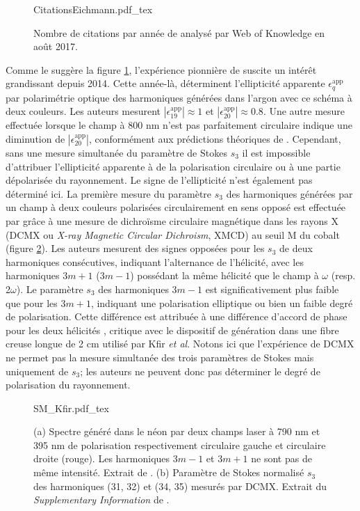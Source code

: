 \begin{figure}[ht]
\centering
\def\svgwidth{0.5\textwidth}
{CitationsEichmann.pdf_tex}
\caption{Nombre de citations par année de  analysé par Web of Knowledge en août 2017.}
\label{fig:CitationsEichmann}
\end{figure}

Comme le suggère la figure \ref{fig:CitationsEichmann}, l'expérience pionnière de  suscite un intérêt grandissant depuis 2014. Cette année-là,  déterminent l'ellipticité apparente $\epsilon_{q}^{\text{app}}$ par polarimétrie optique des harmoniques générées dans l'argon avec ce schéma à deux couleurs. Les auteurs mesurent $|\epsilon_{19}^{\text{app}}| \approx 1 $ et $|\epsilon_{20}^{\text{app}}| \approx 0.8$. Une autre mesure effectuée lorsque le champ à 800 nm n'est pas parfaitement circulaire indique une diminution de $|\epsilon_{20}^{\text{app}}|$, conformément aux prédictions théoriques de . Cependant, sans une mesure simultanée du paramètre de Stokes $s_3$ il est impossible d'attribuer l'ellipticité apparente à de la polarisation circulaire ou à une partie dépolarisée du rayonnement. Le signe de l'ellipticité n'est également pas déterminé ici. La première mesure du paramètre $s_3$ des harmoniques générées par un champ à deux couleurs polarisées circulairement en sens opposé est effectuée par  grâce à une mesure de dichroïsme circulaire magnétique dans les rayons X (DCMX ou \textit{X-ray Magnetic Circular Dichroism}, XMCD) au seuil M du cobalt (figure \ref{fig:SM_Kfir}). Les auteurs mesurent des signes opposées pour les $s_3$ de deux harmoniques consécutives, indiquant l'alternance de l'hélicité, avec les harmoniques $3m+1$ ($3m-1$) possédant la même hélicité que le champ à $\omega$ (resp. 2$\omega$). Le paramètre $s_3$ des harmoniques $3m-1$ est significativement plus faible que pour les $3m+1$, indiquant une polarisation elliptique ou bien un faible degré de polarisation. Cette différence est attribuée à une différence d'accord de phase pour les deux hélicités , critique avec le dispositif de génération dans une fibre creuse longue de 2 cm utilisé par Kfir \textit{et al}. Notons ici que l'expérience de DCMX ne permet pas la mesure simultanée des trois paramètres de Stokes mais uniquement de $s_3$; les auteurs ne peuvent donc pas déterminer le degré de polarisation du rayonnement.

\begin{figure}
\centering
\def\svgwidth{\textwidth}
{SM_Kfir.pdf_tex}
\caption{(a) Spectre généré dans le néon par deux champs laser à 790 nm et 395 nm de polarisation respectivement circulaire gauche et circulaire droite (rouge). Les harmoniques $3m-1$ et $3m+1$ ne sont pas de même intensité. Extrait de . (b) Paramètre de Stokes normalisé $s_3$ des harmoniques (31, 32) et (34, 35)  mesurés par DCMX. Extrait du \textit{Supplementary Information} de .}
\label{fig:SM_Kfir}
\end{figure}

